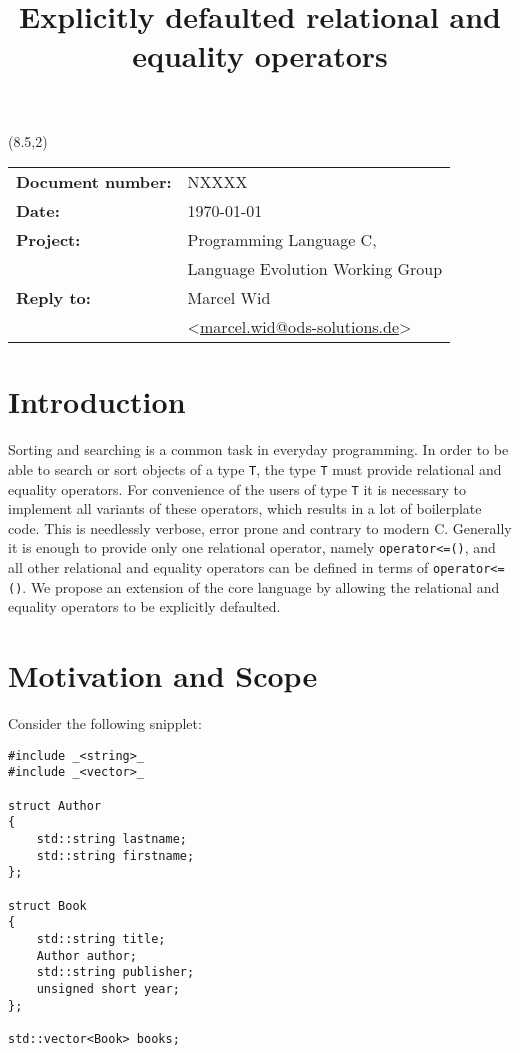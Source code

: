 ﻿\documentclass[a4paper,11pt,final]{article}
\title{Explicitly defaulted relational and equality operators}
\author{}
\date{}
\newcommand{\tcode}[1]{\lstinline{#1}}
\newcommand{\Rplus}{\protect\hspace{-.1em}\protect\raisebox{.1ex}{\small+}}
\newcommand{\Cpp}{\mbox{C\Rplus\Rplus}\xspace}
\begin{document}
\begin{textblock}{12}(8.5,2)
\begin{tabular}{l l}
\textbf{Document number:} & NXXXX\\
\textbf{Date:} & \today\\
\textbf{Project:} & Programming Language \Cpp,\\
& Language Evolution Working Group\\
\textbf{Reply to:} & Marcel Wid\\
& <\href{mailto:marcel.wid@ods-solutions.de}{marcel.wid@ods-solutions.de}>
\end{tabular}
\end{textblock}

\maketitle

\tableofcontents

\section{Introduction}
Sorting and searching is a common task in everyday programming. In order to be able to search or sort objects of a type \tcode{T}, the type \tcode{T} must provide relational and equality operators. For convenience of the users of type \tcode{T} it is necessary to implement all variants of these operators, which results in a lot of boilerplate code. This is needlessly verbose, error prone and contrary to modern \Cpp. Generally it is enough to provide only one relational operator, namely \tcode{operator<=()}, and all other relational and equality operators can be defined in terms of \tcode{operator<=()}. We propose an extension of the core language by allowing the relational and equality operators to be explicitly defaulted.

\section{Motivation and Scope}
Consider the following snipplet:

\begin{lstlisting}
#include _<string>_
#include _<vector>_

struct Author
{
    std::string lastname;
    std::string firstname;
};

struct Book
{
    std::string title;
    Author author;
    std::string publisher;
    unsigned short year;
};

std::vector<Book> books;
\end{lstlisting}
\end{document}
